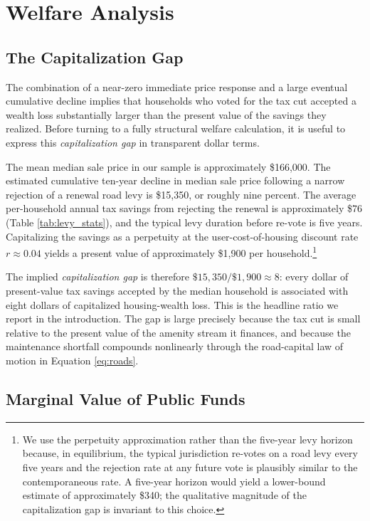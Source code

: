 \section{Welfare Analysis} \label{sec:mvpf}

\subsection{The Capitalization Gap}

The combination of a near-zero immediate price response and a large eventual cumulative decline implies that households who voted for the tax cut accepted a wealth loss substantially larger than the present value of the savings they realized. Before turning to a fully structural welfare calculation, it is useful to express this {\it capitalization gap} in transparent dollar terms.

The mean median sale price in our sample is approximately \$166{,}000. The estimated cumulative ten-year decline in median sale price following a narrow rejection of a renewal road levy is \$15{,}350, or roughly nine percent. The average per-household annual tax savings from rejecting the renewal is approximately \$76 (Table \ref{tab:levy_stats}), and the typical levy duration before re-vote is five years. Capitalizing the savings as a perpetuity at the user-cost-of-housing discount rate $r \approx 0.04$ yields a present value of approximately \$1{,}900 per household.\footnote{We use the perpetuity approximation rather than the five-year levy horizon because, in equilibrium, the typical jurisdiction re-votes on a road levy every five years and the rejection rate at any future vote is plausibly similar to the contemporaneous rate. A five-year horizon would yield a lower-bound estimate of approximately \$340; the qualitative magnitude of the capitalization gap is invariant to this choice.}

The implied {\it capitalization gap} is therefore $\$15{,}350 / \$1{,}900 \approx 8$: every dollar of present-value tax savings accepted by the median household is associated with eight dollars of capitalized housing-wealth loss. This is the headline ratio we report in the introduction. The gap is large precisely because the tax cut is small relative to the present value of the amenity stream it finances, and because the maintenance shortfall compounds nonlinearly through the road-capital law of motion in Equation \ref{eq:roads}.

\subsection{Marginal Value of Public Funds}

